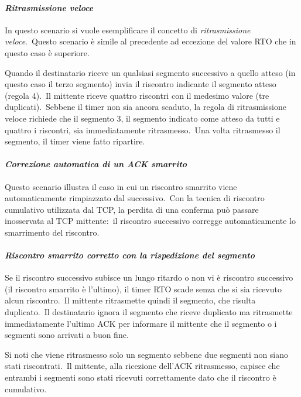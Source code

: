 \paragraph{\emph{Ritrasmissione veloce}}

In questo scenario si vuole esemplificare il concetto di \emph{ritrasmissione veloce}.\
Questo scenario è simile al precedente ad eccezione del valore RTO che in questo caso è superiore.

Quando il destinatario riceve un qualsiasi segmento successivo a quello atteso (in questo caso il terzo segmento) invia il riscontro indicante il segmento atteso (regola 4).\
Il mittente riceve quattro riscontri con il medesimo valore (tre duplicati).\
Sebbene il timer non sia ancora scaduto, la regola di ritrasmissione veloce richiede che il segmento 3, il segmento indicato come atteso da tutti e quattro i riscontri, sia immediatamente ritrasmesso.\
Una volta ritrasmesso il segmento, il timer viene fatto ripartire.

\paragraph{\emph{Correzione automatica di un ACK smarrito}}

Questo scenario illustra il caso in cui un riscontro smarrito viene automaticamente rimpiazzato dal successivo.\
Con la tecnica di riscontro cumulativo utilizzata dal TCP, la perdita di una conferma può passare inosservata al TCP mittente:\ il riscontro successivo corregge automaticamente lo smarrimento del riscontro.

\paragraph{\emph{Riscontro smarrito corretto con la rispedizione del segmento}}

Se il riscontro successivo subisce un lungo ritardo o non vi è riscontro successivo (il riscontro smarrito è l'ultimo), il timer RTO scade senza che si sia ricevuto alcun riscontro.\
Il mittente ritrasmette quindi il segmento, che risulta duplicato.\
Il destinatario ignora il segmento che riceve duplicato ma ritrasmette immediatamente l'ultimo ACK per informare il mittente che il segmento o i segmenti sono arrivati a buon fine.

Si noti che viene ritrasmesso solo un segmento sebbene due segmenti non siano stati riscontrati.\
Il mittente, alla ricezione dell'ACK ritrasmesso, capisce che entrambi i segmenti sono stati ricevuti correttamente dato che il riscontro è cumulativo.


